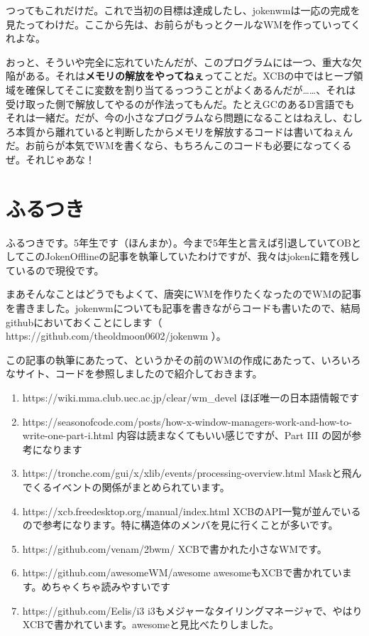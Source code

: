 \documentclass[12pt,a4paper]{jsarticle}
\begin{document}
つってもこれだけだ。これで当初の目標は達成したし、jokenwmは一応の完成を見たってわけだ。ここから先は、お前らがもっとクールなWMを作っていってくれよな。

おっと、そういや完全に忘れていたんだが、このプログラムには一つ、重大な欠陥がある。それは\textbf{メモリの解放をやってねぇ}ってことだ。XCBの中ではヒープ領域を確保してそこに変数を割り当てるっつうことがよくあるんだが……、それは受け取った側で解放してやるのが作法ってもんだ。たとえGCのあるD言語でもそれは一緒だ。だが、今の小さなプログラムなら問題になることはねえし、むしろ本質から離れていると判断したからメモリを解放するコードは書いてねぇんだ。お前らが本気でWMを書くなら、もちろんこのコードも必要になってくるぜ。それじゃあな！


\section{ふるつき}

ふるつきです。5年生です（ほんまか）。今まで5年生と言えば引退していてOBとしてこのJokenOfflineの記事を執筆していたわけですが、我々はjokenに籍を残しているので現役です。

まあそんなことはどうでもよくて、唐突にWMを作りたくなったのでWMの記事を書きました。jokenwmについても記事を書きながらコードも書いたので、結局githubにおいておくことにします（ https://github.com/theoldmoon0602/jokenwm ）。

この記事の執筆にあたって、というかその前のWMの作成にあたって、いろいろなサイト、コードを参照しましたので紹介しておきます。

\begin{enumerate}
\item https://wiki.mma.club.uec.ac.jp/clear/wm\_devel ほぼ唯一の日本語情報です
\item https://seasonofcode.com/posts/how-x-window-managers-work-and-how-to-write-one-part-i.html 内容は読まなくてもいい感じですが、Part III の図が参考になります
\item https://tronche.com/gui/x/xlib/events/processing-overview.html Maskと飛んでくるイベントの関係がまとめられています。
\item https://xcb.freedesktop.org/manual/index.html XCBのAPI一覧が並んでいるので参考になります。特に構造体のメンバを見に行くことが多いです。
\item https://github.com/venam/2bwm/ XCBで書かれた小さなWMです。
\item https://github.com/awesomeWM/awesome awesomeもXCBで書かれています。めちゃくちゃ読みやすいです
\item https://github.com/Eelis/i3 i3もメジャーなタイリングマネージャで、やはりXCBで書かれています。awesomeと見比べたりしました。
\end{enumerate}
\end{document}
